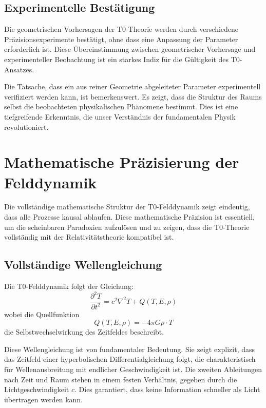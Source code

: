 	\subsection{Experimentelle Bestätigung}
	
	Die geometrischen Vorhersagen der T0-Theorie werden durch verschiedene Präzisionsexperimente bestätigt, ohne dass eine Anpassung der Parameter erforderlich ist. Diese Übereinstimmung zwischen geometrischer Vorhersage und experimenteller Beobachtung ist ein starkes Indiz für die Gültigkeit des T0-Ansatzes.
	
	Die Tatsache, dass ein aus reiner Geometrie abgeleiteter Parameter experimentell verifiziert werden kann, ist bemerkenswert. Es zeigt, dass die Struktur des Raums selbst die beobachteten physikalischen Phänomene bestimmt. Dies ist eine tiefgreifende Erkenntnis, die unser Verständnis der fundamentalen Physik revolutioniert.
	
	\section{Mathematische Präzisierung der Felddynamik}
	
	Die vollständige mathematische Struktur der T0-Felddynamik zeigt eindeutig, dass alle Prozesse kausal ablaufen. Diese mathematische Präzision ist essentiell, um die scheinbaren Paradoxien aufzulösen und zu zeigen, dass die T0-Theorie vollständig mit der Relativitätstheorie kompatibel ist.
	
	\subsection{Vollständige Wellengleichung}
	
	Die T0-Felddynamik folgt der Gleichung:
	\begin{equation}
		\frac{\partial^2 T}{\partial t^2} = c^2\nabla^2 T + Q(T, E, \rho) \label{eq:wave_equation}
	\end{equation}
	wobei die Quellfunktion
	\begin{equation}
		Q(T, E, \rho) = -4\pi G \rho \cdot T
	\end{equation}
	die Selbstwechselwirkung des Zeitfeldes beschreibt.
	
	Diese Wellengleichung ist von fundamentaler Bedeutung. Sie zeigt explizit, dass das Zeitfeld einer hyperbolischen Differentialgleichung folgt, die charakteristisch für Wellenausbreitung mit endlicher Geschwindigkeit ist. Die zweiten Ableitungen nach Zeit und Raum stehen in einem festen Verhältnis, gegeben durch die Lichtgeschwindigkeit $c$. Dies garantiert, dass keine Information schneller als Licht übertragen werden kann.
	
